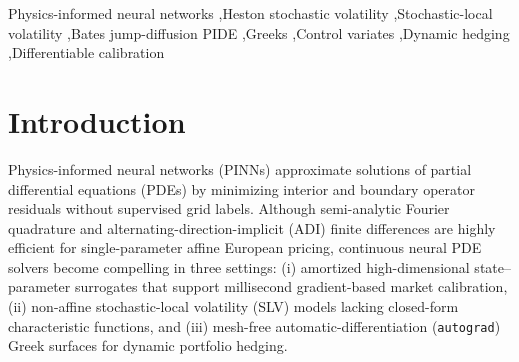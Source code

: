 \documentclass[preprint,12pt]{elsarticle}
\begin{document}
\begin{frontmatter}
\begin{abstract}
(\texttt{SPX}/\texttt{SPXW}) trading days ($\mathbf{5.44\text{M}+}$ option quotes from 2000--2026 via Wharton WRDS OptionMetrics IvyDB US and live Cboe, every one of which violates the Feller condition), dual-regime 10D neural autograd delivers $\mathbf{10\times\text{--}130\times}$ faster calibration with parity-grade out-of-sample accuracy and tracks Exact Fourier dynamic hedging within $\$0.44$ across $1{,}200$ market-marked WRDS contract-days where baseline \texttt{B0} destabilizes hedging completely.
\end{abstract}

\begin{keyword}
Physics-informed neural networks \sep Heston stochastic volatility \sep Stochastic-local volatility \sep Bates jump-diffusion PIDE \sep Greeks \sep Control variates \sep Dynamic hedging \sep Differentiable calibration
\end{keyword}

\end{frontmatter}

\section{Introduction}
\label{sec:intro}

Physics-informed neural networks (PINNs) \cite{raissi2019physics,lu2021deepxde} approximate solutions of partial differential equations (PDEs) by minimizing interior and boundary operator residuals without supervised grid labels. Although semi-analytic Fourier quadrature \cite{heston1993closed,lewis2000option,albrecher2007little} and alternating-direction-implicit (ADI) finite differences \cite{inthout2010adi} are highly efficient for single-parameter affine European pricing, continuous neural PDE solvers become compelling in three settings: (i) amortized high-dimensional state--parameter surrogates that support millisecond gradient-based market calibration, (ii) non-affine stochastic-local volatility (SLV) models \cite{ren2007calibrating} lacking closed-form characteristic functions, and (iii) mesh-free automatic-differentiation (\texttt{autograd}) Greek surfaces for dynamic portfolio hedging.
\end{document}
